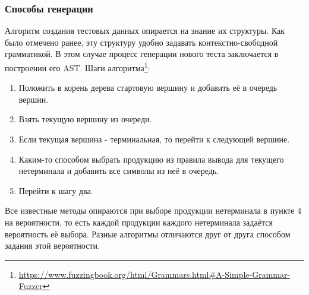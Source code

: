 \documentclass[a4paper]{article}
\begin{document}
\subsubsection{Способы генерации}
\indent

Алгоритм создания тестовых данных опирается на знание их структуры. Как было отмечено ранее, эту структуру удобно задавать контекстно-свободной грамматикой. В этом случае процесс генерации нового теста заключается в построении его AST. Шаги алгоритма\footnote[1]{\href{https://www.fuzzingbook.org/html/Grammars.html\#A-Simple-Grammar-Fuzzer}{https://www.fuzzingbook.org/html/Grammars.html\#A-Simple-Grammar-Fuzzer}}:

\begin{enumerate}
    \item Положить в корень дерева стартовую вершину и добавить её в очередь вершин.
    \item Взять текущую вершину из очереди.
    \item Если текущая вершина - терминальная, то перейти к следующей вершине.
    \item Каким-то способом выбрать продукцию из правила вывода для текущего нетерминала и добавить все символы из неё в очередь.
    \item Перейти к шагу два.
\end{enumerate}

Все известные методы опираются при выборе продукции нетерминала в пункте 4 на вероятности, то есть каждой продукции каждого нетерминала задаётся вероятность её выбора. Разные алгоритмы отличаются друг от друга способом задания этой вероятности. 
\end{document}
